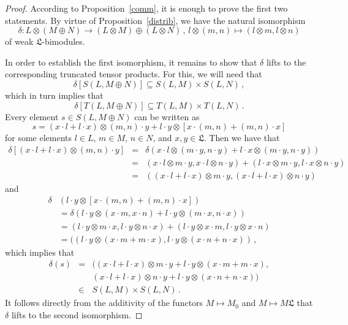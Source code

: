 \documentclass{jonasart}
\newcommand{\lf}{\mathfrak{L}}
\begin{document}
	\begin{proof}
		According to Proposition~\ref{comm}, it is enough to prove the first two statements. By virtue of Proposition~\ref{distrib}, we have the natural isomorphism
		\[
			\delta:L\otimes(M\oplus N)\to(L\otimes M)\oplus(L\otimes N)\,,\, l\otimes(m,n)\mapsto(l\otimes m,l\otimes n)
		\]
		of weak $\lf$-bimodules.

		In order to establish the first isomorphism, it remains to show that
		$\delta$ lifts to the corresponding truncated tensor products. For this, we will need that
		\[
			\delta[S(L,M\oplus N)]\subseteq S(L,M)\times S(L,N)\,,
		\]
		which in turn implies that
		\[
			\delta[T(L,M\oplus N)]\subseteq T(L,M)\times T(L,N)\,.
		\]
		Every element $s\in S(L,M\oplus N)$ can be written as
		\[
			s=(x\cdot l+l\cdot x)\otimes(m,n)\cdot y+l\cdot y\otimes
			[x\cdot(m,n)+(m,n)\cdot x]
		\]
		for some elements $l\in L$, $m\in M$, $n\in N$, and $x,y\in\lf$. Then we have that
		\begin{eqnarray*}
			\delta[(x\cdot l+l\cdot x)\otimes(m,n)\cdot y] & = & \delta
			(x\cdot l\otimes(m\cdot y,n\cdot y)+l\cdot x\otimes(m\cdot y,n\cdot y))\\
			& = & (x\cdot l\otimes m\cdot y,x\cdot l\otimes n\cdot y)+(l\cdot x\otimes m
			\cdot y,l\cdot x\otimes n\cdot y)\\
			& = & ((x\cdot l+l\cdot x)\otimes m\cdot y,(x\cdot l+l\cdot x)\otimes n\cdot y)
		\end{eqnarray*}
		and
		\begin{align*}
			\delta { }&{ } (l\cdot y\otimes[x\cdot(m,n)+(m,n)\cdot x]) \\
            & =\delta
			(l\cdot y\otimes(x\cdot m,x\cdot n)+l\cdot y\otimes(m\cdot x,n\cdot x))\\
			& = (l\cdot y\otimes m\cdot x,l\cdot y\otimes n\cdot x)+(l\cdot y\otimes x\cdot m,l\cdot y\otimes x\cdot n)\\
			& = ((l\cdot y\otimes(x\cdot m+m\cdot x),l\cdot y\otimes(x\cdot n+n\cdot x))\,,
		\end{align*}
		which implies that
		\begin{eqnarray*}
			\delta(s) & = &
			((x\cdot l+l\cdot x)\otimes m\cdot y+l\cdot y\otimes(x\cdot m+m\cdot x),\\
			&&(x\cdot l+l\cdot x)\otimes n\cdot y+l\cdot y\otimes(x\cdot n+n\cdot x))\\
			& \in & S(L,M)\times S(L,N)\,.
		\end{eqnarray*}
		It follows directly from the additivity of the functors $M\mapsto M_0$
		and $M\mapsto M\lf$ that $\delta$ lifts to the second isomorphism.
	\end{proof}
\end{document}
